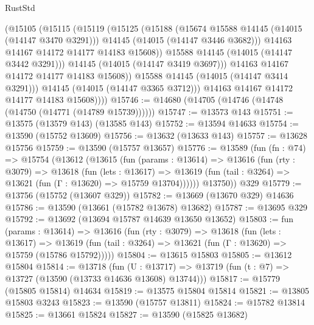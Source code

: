\begin{lexlean}{RustStd}
\begin{coremodule}
                    (@15105
                      (@15115
                        (@15119
                          (@15125
                            (@15188
                              (@15674 @15588 @14145 (@14015 (@14147 @3470 @3291)))
                              @14145
                              (@14015 (@14147 @3446 @3682)))
                            @14163
                            @14167
                            @14172
                            @14177
                            @14183
                            @15608))
                        @15588
                        @14145
                        (@14015 (@14147 @3442 @3291)))
                      @14145
                      (@14015 (@14147 @3419 @3697)))
                    @14163
                    @14167
                    @14172
                    @14177
                    @14183
                    @15608))
                @15588
                @14145
                (@14015 (@14147 @3414 @3291)))
              @14145
              (@14015 (@14147 @3365 @3712)))
            @14163
            @14167
            @14172
            @14177
            @14183
            @15608))))
@15746 := @14680 (@14705 (@14746 (@14748 (@14750 (@14771 (@14789 @15739))))))
@15747 := @13573 @143
@15751 := @13575 (@13579 @143) (@13585 @143)
@15752 := @13594 @14633
@15754 := @13590 (@15752 @13609)
@15756 := @13632 (@13633 @143)
@15757 := @13628 @15756
@15759 := @13590 (@15757 @13657)
@15776 := @13589
    (fun (fn : @74) =>
    @15754
      (@13612
        (@13615
          (fun (params : @13614) =>
          @13616
            (fun (rty : @3079) =>
            @13618
              (fun (lets : @13617) =>
              @13619 (fun (tail : @3264) => @13621 (fun (Γ : @13620) => @15759 @13704))))))
        @13750))
    @329
@15779 := @13756 (@15752 (@13607 @329))
@15782 := @13669 (@13670 @329) @14636
@15786 := @13590 (@13661 (@15782 @13678) @13682)
@15787 := @13695 @329
@15792 := @13692 (@13694 @15787 @14639 @13650 @13652)
@15803 := fun (params : @13614) =>
  @13616
    (fun (rty : @3079) =>
    @13618
      (fun (lets : @13617) =>
      @13619 (fun (tail : @3264) => @13621 (fun (Γ : @13620) => @15759 (@15786 @15792)))))
@15804 := @13615 @15803
@15805 := @13612 @15804
@15814 := @13718
    (fun (U : @13717) => @13719 (fun (t : @7) => @13727 (@13590 (@13733 @14636 @13608) @13744)))
@15817 := @15779 (@15805 @15814) @14634
@15819 := @13575 @15804 @15814
@15821 := @13805 @15803 @3243
@15823 := @13590 (@15757 @13811)
@15824 := @15782 @13814
@15825 := @13661 @15824
@15827 := @13590 (@15825 @13682)

\end{coremodule}
\end{lexlean}
